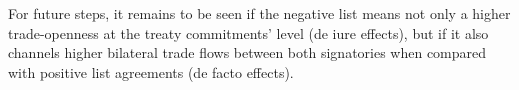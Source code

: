 \documentclass{article}
\begin{document}
\smallskip

For future steps, it remains to be seen if the negative list means not only a higher trade-openness at the treaty commitments’ level (de iure effects), but if it also channels higher bilateral trade flows between both signatories when compared with positive list agreements (de facto effects).

\appendix

\end{document}
